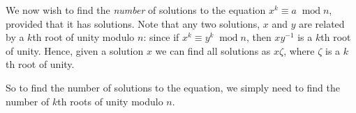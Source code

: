 \documentclass[10pt]{article}
\newenvironment{proof}[1][Proof]{\begin{trivlist}
\item[\hskip \labelsep {\bfseries #1}]}{\end{trivlist}}
\newcommand{\modulo}[1]{\;\operatorname{mod} #1}
\begin{document}
\begin{proof}
       
        
        
    \end{proof}
    
    We now wish to find the \emph{number}
    of solutions to the equation $x^k \equiv a\modulo{n}$, provided
    that it has solutions. Note that any two solutions, $x$ and $y$
    are related by a $k$th root of unity modulo $n$: since if $x^k\equiv y^k \modulo{n}$, then
    $xy^{-1}$ is a $k$th root of unity. Hence, given a solution
    $x$ we can find all solutions as $x\zeta$, where $\zeta$
    is a $k$th root of unity.
    
    So to find the number of solutions to the equation, we simply
    need to find the number of $k$th roots of unity modulo $n$.
    
\end{document}
